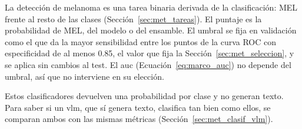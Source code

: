 La detección de melanoma es una tarea binaria derivada de la clasificación: MEL frente al resto de las clases
(Sección~\ref{sec:met_tareas}). El puntaje es la probabilidad de MEL, del modelo o del ensamble. El umbral se fija en
validación como el que da la mayor sensibilidad entre los puntos de la curva ROC con especificidad de al menos 0.85, el
valor que fija la Sección~\ref{sec:met_seleccion}, y se aplica sin cambios al test. El \gls{auc} (Ecuación~\ref{eq:marco_auc})
no depende del umbral, así que no interviene en su elección.

Estos clasificadores devuelven una probabilidad por clase y no generan texto. Para saber si un \gls{vlm}, que sí genera
texto, clasifica tan bien como ellos, se comparan ambos con las mismas métricas (Sección~\ref{sec:met_clasif_vlm}).
